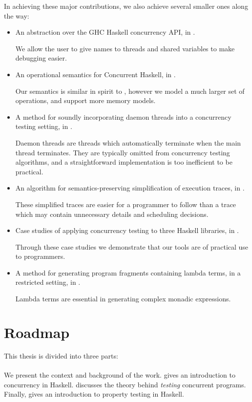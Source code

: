 In achieving these major contributions, we also achieve several
smaller ones along the way:

\begin{itemize}
\item An abstraction over the GHC Haskell concurrency API, in
  .

  We allow the user to give names to threads and shared variables to
  make debugging easier.
\item An operational semantics for Concurrent Haskell, in
  .

  Our semantics is similar in spirit to \cite{vollmer2017}, however we
  model a much larger set of operations, and support more memory
  models.
\item A method for soundly incorporating daemon threads into a
  concurrency testing setting, in .

  Daemon threads are threads which automatically terminate when the
  main thread terminates.  They are typically omitted from concurrency
  testing algorithms, and a straightforward implementation is too
  inefficient to be practical.
\item An algorithm for semantics-preserving simplification of
  execution traces, in .

  These simplified traces are easier for a programmer to follow than a
  trace which may contain unnecessary details and scheduling
  decisions.
\item Case studies of applying concurrency testing to three Haskell
  libraries, in .

  Through these case studies we demonstrate that our tools are of
  practical use to programmers.
\item A method for generating program fragments containing lambda
  terms, in a restricted setting, in .

  Lambda terms are essential in generating complex monadic
  expressions.
\end{itemize}

\section{Roadmap}
\label{sec:intro-roadmap}

This thesis is divided into three parts:

\paragraph{}
We present the context and background of the work.
 gives an introduction to concurrency in
Haskell.   discusses the theory behind \emph{testing}
concurrent programs.  Finally,  gives an
introduction to property testing in Haskell.

